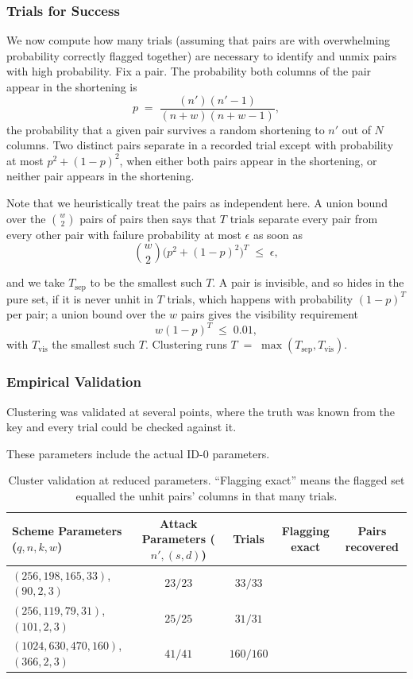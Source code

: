 \subsubsection{Trials for Success}\label{sec:cluster-planning}

We now compute how many trials (assuming that pairs are with overwhelming probability correctly flagged together) 
are necessary to identify and unmix pairs with high probability. Fix a pair. 
The probability both columns of the pair appear in the shortening is \[
    p \;=\; \frac{(n')(n'-1)}{(n+w)(n+w-1)},
\]
the probability that a given pair survives a random shortening to
$n'$ out of $N$ columns. Two distinct pairs separate in a recorded trial
except with probability at
most $p^2 + (1 - p)^2$, when either both pairs appear in the shortening, or neither pair appears in the shortening.


Note that we heuristically treat the pairs as independent here. A union bound over the $\binom{w}{2}$ pairs of
pairs then says that $T$ trials separate every pair from every
other pair with failure probability at most $\epsilon$ as soon as
\[
    \binom{w}{2} \bigl(p^2 + (1 - p)^2\bigr)^T \;\leq\; \epsilon,
\]

and we take $T_{\mathrm{sep}}$ to be the smallest such $T$. A pair
is invisible, and so hides in the pure set, if it is never unhit
in $T$ trials, which happens with probability $(1 - p)^T$ per pair;
a union bound over the $w$ pairs gives the visibility requirement
\[
    w (1 - p)^T \;\leq\; 0.01,
\]
with $T_{\mathrm{vis}}$ the smallest such $T$. Clustering runs $
    T \;=\; \max(T_{\mathrm{sep}}, T_{\mathrm{vis}})
$.

\subsubsection{Empirical Validation}\label{sec:cluster-validation}

Clustering was validated at several points, where the truth
was known from the key and every trial could be checked against
it. 

These parameters include the actual ID-0 parameters. 

\begin{table}[htbp]
    \centering
    \footnotesize
    \begin{tabular}{lcccc}
        \toprule
        Scheme Parameters ($q, n, k, w$) & Attack Parameters ($n',(s,d)$)  & Trials & Flagging exact & Pairs recovered \\
        \midrule
        $(256, 198, 165, 33)$, $(90, 2, 3)$           & $23/23$        & $33/33$    \\
        $(256, 119, 79, 31)$, $(101, 2, 3)$  & $25/25$        & $31/31$   \\
        $(1024, 630, 470, 160)$, $(366, 2, 3)$ & $41/41$ & $160/160$ \\ 
        \bottomrule
    \end{tabular}
    \caption{Cluster validation at reduced parameters. ``Flagging
        exact'' means the flagged set equalled the unhit pairs' columns
        in that many trials.}
    \label{tab:cluster-validation}
\end{table}


